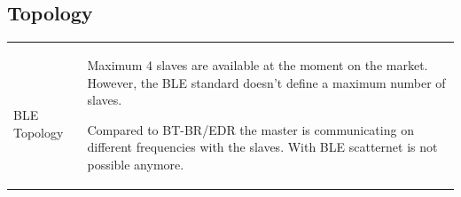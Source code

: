 	\subsection{Topology}
		\begin{tabular}{ll}
			\parbox{8cm}{
				 \\ BLE Topology 
			}	
			& \parbox{8cm}{
				Maximum 4 slaves are available at the moment on the market. However, the BLE standard doesn't define a maximum number of slaves.
				
				Compared to BT-BR/EDR the master is communicating on different frequencies with the slaves.
				With BLE scatternet is not possible anymore.
			}	
		\end{tabular}
